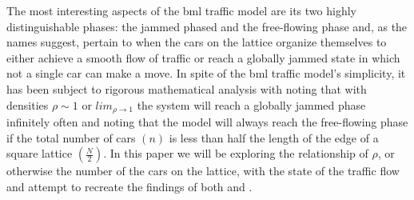 \noindent The most interesting aspects of the \gls{bml} traffic model are its two highly distinguishable phases: the jammed phased and the free-flowing phase and, as the names suggest, pertain to when the cars on the lattice organize themselves to either achieve a smooth flow of traffic or reach a globally jammed state in which not a single car can make a move. In spite of the \gls{bml} traffic model's simplicity, it has been subject to rigorous mathematical analysis with \citet{Omer} noting that with densities $\rho \sim 1$ or $lim_{\rho \to 1}$ the system will reach a globally jammed phase infinitely often and \citet{Austin} noting that the model will always reach the free-flowing phase if the total number of cars $(n)$ is less than half the length of the edge of a square lattice $(\frac{N}{2})$. In this paper we will be exploring the relationship of $\rho$, or otherwise the number of the cars on the lattice, with the state of the traffic flow and attempt to recreate the findings of both \citeauthor{Omer} and \citeauthor{Austin}.